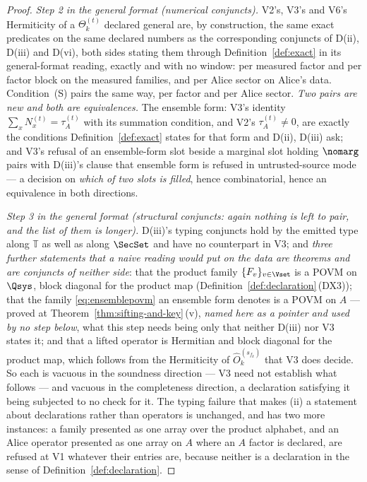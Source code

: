 \begin{proof}
\emph{Step 2 in the general format (numerical conjuncts).} V2's, V3's and
V6's Hermiticity of a $\Theta^{(t)}_k$ declared general are, by construction,
the same exact predicates on the same declared numbers as the corresponding
conjuncts of D(ii), D(iii) and D(vi), both sides stating them through
Definition~\ref{def:exact} in its general-format reading, exactly and with no
window: per measured factor and per factor block on the measured families,
and per Alice sector on Alice's data. Condition~(S) pairs the same way, per
factor and per Alice sector. \emph{Two pairs are new and both are
equivalences.} The ensemble form: V3's identity $\sum_xN^{(t)}_x=\tau^{(t)}_A$
with its summation condition, and V2's $\tau^{(t)}_A\ne0$, are exactly the
conditions Definition~\ref{def:exact} states for that form and D(ii), D(iii)
ask; and V3's refusal of an ensemble-form slot beside a marginal slot holding
$\nomarg$ pairs with D(iii)'s clause that ensemble form is refused in
untrusted-source mode --- a decision on \emph{which of two slots is filled},
hence combinatorial, hence an equivalence in both directions.

\emph{Step 3 in the general format (structural conjuncts: again nothing is
left to pair, and the list of them is longer).} D(iii)'s typing conjuncts
hold by the emitted type along $\mathbb{T}$ as well as along $\SecSet$ and
have no counterpart in V3; and \emph{three further statements that a naive
reading would put on the data are theorems and are conjuncts of neither
side}: that the product family $\{F_v\}_{v\in\Vset}$ is a POVM on $\Qsys$,
block diagonal for the product map (Definition~\ref{def:declaration}\,(DX3));
that the family \eqref{eq:ensemblepovm} an ensemble form denotes is a POVM on
$A$ --- proved at Theorem~\ref{thm:sifting-and-key}\,(v), \emph{named here as a pointer
and used by no step below}, what this step needs being only that neither
D(iii) nor V3 states it; and that a lifted operator is Hermitian and block
diagonal for the product map, which follows from the Hermiticity of
$\hat O^{(s_{f_k})}_k$ that V3 does decide. So each is vacuous in the
soundness direction --- V3 need not establish what follows --- and vacuous in
the completeness direction, a declaration satisfying it being subjected to no
check for it. The typing failure that makes (ii) a statement about
declarations rather than operators is unchanged, and has two more instances: a
family presented as one array over the product alphabet, and an Alice operator
presented as one array on $A$ where an $A$ factor is declared, are refused at
V1 whatever their entries are, because neither is a declaration in the sense
of Definition~\ref{def:declaration}.


\end{proof}
